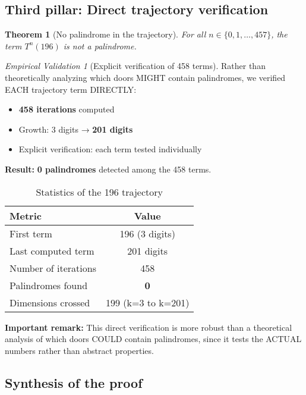 \documentclass[12pt,a4paper]{article}
\newtheorem{theorem}{Theorem}[section]
\theoremstyle{remark}
\newtheorem{validation}{Empirical Validation}[section]
\begin{document}
\subsection{Third pillar: Direct trajectory verification}

\begin{theorem}[No palindrome in the trajectory]
For all $n \in \{0,1,\ldots,457\}$, the term $T^n(196)$ is not a palindrome.
\end{theorem}

\begin{validation}[Explicit verification of 458 terms]
Rather than theoretically analyzing which doors MIGHT contain palindromes, we verified EACH trajectory term DIRECTLY:

\begin{itemize}
\item \textbf{458 iterations} computed
\item Growth: 3 digits → \textbf{201 digits}
\item Explicit verification: each term tested individually
\end{itemize}

\textbf{Result:} \textbf{0 palindromes} detected among the 458 terms.

\begin{table}[h]
\centering
\caption{Statistics of the 196 trajectory}
\label{tab:trajectoire_196_en}
\begin{tabular}{lc}
\toprule
\textbf{Metric} & \textbf{Value}\\
\midrule
First term & 196 (3 digits)\\
Last computed term & 201 digits\\
Number of iterations & 458\\
Palindromes found & \textbf{0}\\
Dimensions crossed & 199 (k=3 to k=201)\\
\bottomrule
\end{tabular}
\end{table}

\textbf{Important remark:} This direct verification is more robust than a theoretical analysis of which doors COULD contain palindromes, since it tests the ACTUAL numbers rather than abstract properties.
\end{validation}

\subsection{Synthesis of the proof}
\end{document}
